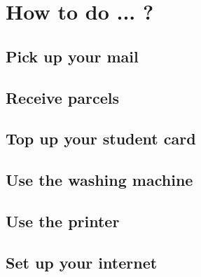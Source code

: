 \chapter{How to do ... ?} \label{chap:qna}

\section{Pick up your mail}

\section{Receive parcels}

\section{Top up your student card}

\section{Use the washing machine}

\section{Use the printer}

\section{Set up your internet}